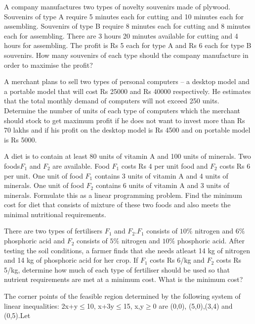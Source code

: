 \item A company manufactures two types of novelty souvenirs made of plywood.
Souvenirs of type A require 5 minutes each for cutting and 10 minutes each for
assembling. Souvenirs of type B require 8 minutes each for cutting and 8 minutes
each for assembling. There are 3 hours 20 minutes available for cutting and 4
hours for assembling. The profit is Rs 5 each for type A and Rs 6 each for type
B souvenirs. How many souvenirs of each type should the company manufacture
in order to maximise the profit?\\
\solution

\item A merchant plans to sell two types of personal computers – a desktop model and
a portable model that will cost Rs 25000 and Rs 40000 respectively. He estimates
that the total monthly demand of computers will not exceed 250 units. Determine
the number of units of each type of computers which the merchant should stock
to get maximum profit if he does not want to invest more than Rs 70 lakhs and if
his profit on the desktop model is Rs 4500 and on portable model is Rs 5000.\\
\item A diet is to contain at least 80 units of vitamin A and 100 units of minerals. Two
foods$ F_{1}$ and $F_{2}$ are available. Food $F_{1}$ costs Rs 4 per unit food and $F_{2}$ costs
Rs 6 per unit. One unit of food $F_{1}$ contains 3 units of vitamin A and 4 units of
minerals. One unit of food $F_{2}$ contains 6 units of vitamin A and 3 units of minerals.
Formulate this as a linear programming problem. Find the minimum cost for diet
that consists of mixture of these two foods and also meets the minimal nutritional
requirements.\\
\item There are two types of fertilisers $F_{1}$ and $F_{2}$.$F_{1}$ consists of $10\%$ nitrogen and $6\%$
phosphoric acid and $F_{2}$ consists of $5\%$ nitrogen and $10\%$ phosphoric acid. After
testing the soil conditions, a farmer finds that she needs atleast 14 kg of nitrogen
and 14 kg of phosphoric acid for her crop. If $F_{1}$ costs Rs 6/kg and $F_{2}$ costs
Rs 5/kg, determine how much of each type of fertiliser should be used so that
nutrient requirements are met at a minimum cost. What is the minimum cost?\\
\item The corner points of the feasible region determined by the following system of
linear inequalities:
2x+y$\leq$10, x+3y$\leq$15, x,y$\geq$0 are (0,0), (5,0),(3,4) and (0,5).Let
